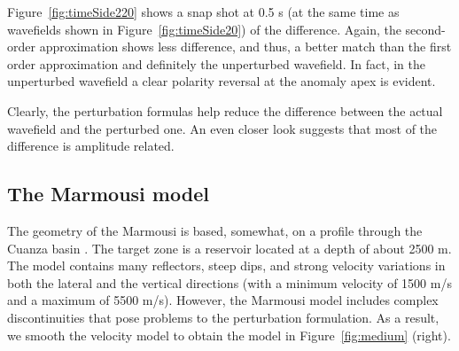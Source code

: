 

Figure~\ref{fig:timeSide220} shows a snap shot at 0.5 s (at the same time as wavefields shown in Figure~\ref{fig:timeSide20}) of the difference. Again,
the second-order approximation shows less difference, and thus, a better match than the first order approximation and definitely the unperturbed wavefield. 
In fact, in the unperturbed wavefield a clear polarity reversal at the anomaly apex is evident.


Clearly, the perturbation formulas help reduce the difference between the actual wavefield and the perturbed one. An even closer look suggests that most
of the difference is amplitude related.

\subsection{The Marmousi model}


The geometry of the Marmousi is based, somewhat, on
a profile  through the Cuanza basin \cite{versteeg93}. 
The target zone is a reservoir located 
at a depth of about 2500 m. The model contains many reflectors, steep dips, 
and strong velocity variations in both the lateral and the vertical
directions (with a minimum velocity of 1500 m/s and a maximum of 5500 m/s). However, the Marmousi
model includes complex discontinuities that pose problems to the perturbation formulation. As a
result, we smooth the velocity model to obtain the model in Figure~\ref{fig:medium} (right). 

